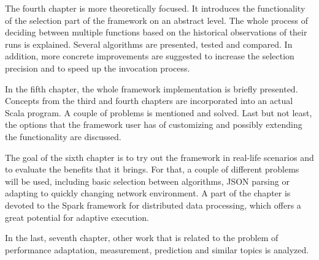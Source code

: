 The fourth chapter is more theoretically focused. It introduces the functionality of the selection part of the framework on an abstract level. The whole process of deciding between multiple functions based on the historical observations of their runs is explained. Several algorithms are presented, tested and compared. In addition, more concrete improvements are suggested to increase the selection precision and to speed up the invocation process.

In the fifth chapter, the whole framework implementation is briefly presented. Concepts from the third and fourth chapters are incorporated into an actual Scala program. A couple of problems is mentioned and solved. Last but not least, the options that the framework user has of customizing and possibly extending the functionality are discussed.

The goal of the sixth chapter is to try out the framework in real-life scenarios and to evaluate the benefits that it brings. For that, a couple of different problems will be used, including basic selection between algorithms, JSON parsing or adapting to quickly changing network environment. A part of the chapter is devoted to the Spark framework for distributed data processing, which offers a great potential for adaptive execution.

In the last, seventh chapter, other work that is related to the problem of performance adaptation, measurement, prediction and similar topics is analyzed.